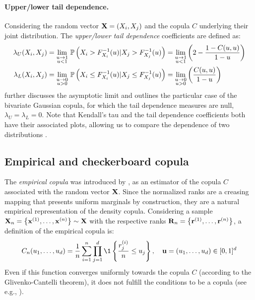 \paragraph{Upper/lower tail dependence.} 
Considering the random vector $\bX = (X_i, X_j)$ and the copula $C$ underlying their joint distribution. 
The \textit{upper/lower tail dependence} coefficients are defined as: 
\begin{subequations}
    \begin{align}
        \lambda_U(X_i, X_j) &= \lim_{\substack{u \rightarrow 1 \\ u<1}} \, \P\left(X_i > F_{X_i}^{-1}(u) | X_j > F_{X_j}^{-1}(u)\right) =       \lim_{\substack{u \rightarrow 1 \\ u<1}} \left(2 - \frac{1 - C(u, u)}{1 - u}\right)\\
        \lambda_L(X_i, X_j) &= \lim_{\substack{u \rightarrow 0 \\ u>0}} \, \P\left(X_i \leq F_{X_i}^{-1}(u) | X_j \leq F_{X_j}^{-1}(u)\right) = \lim_{\substack{u \rightarrow 0 \\ u>0}} \left(\frac{C(u, u)}{1 - u}\right) 
    \end{align}
\end{subequations}
\cite{joe_2014} further discusses the asymptotic limit and outlines the particular case of the bivariate Gaussian copula, for which the tail dependence measures are null, $\lambda_U = \lambda_L = 0$.
Note that Kendall's tau and the tail dependence coefficients both have their associated plots, allowing us to compare the dependence of two distributions .

\subsection{Empirical and checkerboard copula}

The \textit{empirical copula} was introduced by \citet{deheuvels_1979_empirical_copula}, as an estimator of the copula $C$ associated with the random vector $\bX$. 
Since the normalized ranks are a creasing mapping that presents uniform marginals by construction, they are a natural empirical representation of the density copula. 
Considering a sample $\bX_n = \left\{\bx^{(1)}, \dots, \bx^{(n)}\right\} \sim \bX$ with the respective ranks $\bR_n = \left\{\br^{(1)}, \dots, \br^{(n)}\right\}$, a definition of the empirical copula is: 
\begin{equation}
    C_n(u_1, \dots, u_d) = \frac1n \sum_{i=1}^{n} \prod_{j=1}^{d} \1 \left\{ \frac{r_j^{(i)}}{n} \leq u_j \right\}, \quad  \bu = (u_1, \dots, u_d) \in [0, 1]^d
    \label{eq:empirical_copula}
\end{equation}
Even if this function converges uniformly towards the copula $C$ (according to the Glivenko-Cantelli theorem), it does not fulfill the conditions to be a copula (see e.g., \citealt{gonzalez_2021_checkerboard_copula}). 

